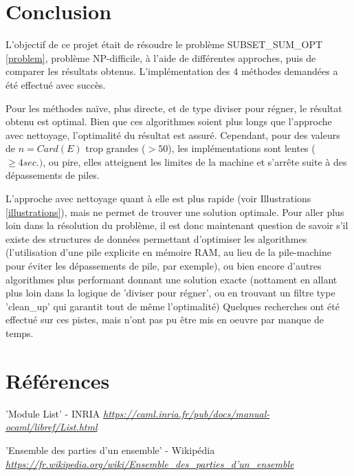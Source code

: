 \documentclass[10pt]{article}
\begin{document}
		\section{Conclusion}
			L'objectif de ce projet était de résoudre le problème SUBSET\_SUM\_OPT \ref{problem}, problème NP-difficile,
			à l'aide de différentes approches, puis de comparer les résultats obtenus.
			\newline
			\newline
			L'implémentation des 4 méthodes demandées a été effectué avec succès.
			\newline
			
			Pour les méthodes naïve, plus directe, et de type diviser pour régner, le résultat obtenu est optimal.
			Bien que ces algorithmes soient plus longs que l'approche avec nettoyage, l'optimalité du résultat est assuré.
			\newline
			Cependant, pour des valeurs de $n = Card(E)$ trop grandes ($ > 50$), les implémentations sont lentes ($\geq 4 sec.)$,
			ou pire, elles atteignent les limites de la machine et s'arrête suite à des dépassements de piles.
			\newline
			
			L'approche avec nettoyage quant à elle est plus rapide (voir Illustrations \ref{illustrations}),
			mais ne permet de trouver une solution optimale.
			\newline
			\newline
			Pour aller plus loin dans la résolution du problème, il est donc maintenant question de savoir
			s'il existe des structures de données permettant d'optimiser les algorithmes
			(l'utilisation d'une pile explicite en mémoire RAM, au lieu de la pile-machine pour éviter les dépassements de pile, par exemple),
			ou bien encore d'autres algorithmes plus performant donnant une solution exacte (nottament en allant plus loin dans la logique
			de 'diviser pour régner', ou en trouvant un filtre type 'clean\_up' qui garantit tout de même l'optimalité)
			\newline
			\newline
			Quelques recherches ont été effectué sur ces pistes, mais n'ont pas pu être mis en oeuvre par manque de temps.
			
	\newpage
	\section{Références}
		\begin{thebibliography}{}
				'Module List' - INRIA\newline
				\href{https://caml.inria.fr/pub/docs/manual-ocaml/libref/List.html}
				      {\textit{https://caml.inria.fr/pub/docs/manual-ocaml/libref/List.html}}
				      
				'Ensemble des parties d'un ensemble' - Wikipédia\newline
				\href{https://fr.wikipedia.org/wiki/Ensemble\_des\_parties\_d'un\_ensemble}
				      {\textit{https://fr.wikipedia.org/wiki/Ensemble\_des\_parties\_d'un\_ensemble}}
				      
  \end{thebibliography}
\end{document}
